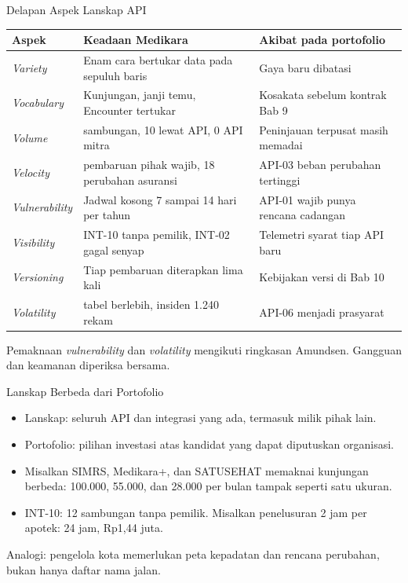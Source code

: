 \documentclass[aspectratio=169, table, 12pt]{beamer}
\begin{document}
\begin{frame}{{\Large Delapan Aspek Lanskap API}}
  \scriptsize
  \begin{tabularx}{\textwidth}{>{\raggedright\arraybackslash}p{1.9cm} >{\raggedright\arraybackslash}X >{\raggedright\arraybackslash}p{4.7cm}}
    \hline
    \textbf{Aspek} & \textbf{Keadaan Medikara} & \textbf{Akibat pada portofolio} \\ \hline
    \textit{Variety} & Enam cara bertukar data pada sepuluh baris & Gaya baru dibatasi \\ \hline
    \textit{Vocabulary} & Kunjungan, janji temu, Encounter tertukar & Kosakata sebelum kontrak Bab 9 \\ \hline
    \textit{Volume} & 100 sambungan, 10 lewat API, 0 API mitra & Peninjauan terpusat masih memadai \\ \hline
    \textit{Velocity} & 4 pembaruan pihak wajib, 18 perubahan asuransi & API-03 beban perubahan tertinggi \\ \hline
    \textit{Vulnerability} & Jadwal kosong 7 sampai 14 hari per tahun & API-01 wajib punya rencana cadangan \\ \hline
    \textit{Visibility} & INT-10 tanpa pemilik, INT-02 gagal senyap & Telemetri syarat tiap API baru \\ \hline
    \textit{Versioning} & Tiap pembaruan diterapkan lima kali & Kebijakan versi di Bab 10 \\ \hline
    \textit{Volatility} & 138 tabel berlebih, insiden 1.240 rekam & API-06 menjadi prasyarat \\ \hline
  \end{tabularx}

  \vspace{6pt}
  {\footnotesize Pemaknaan \textit{vulnerability} dan \textit{volatility} mengikuti ringkasan Amundsen. Gangguan dan keamanan diperiksa bersama.}
\end{frame}

\begin{frame}{{\Large Lanskap Berbeda dari Portofolio}}
  \vspace{8pt}
  \begin{itemize}
    \item Lanskap: seluruh API dan integrasi yang ada, termasuk milik pihak lain.
    \item Portofolio: pilihan investasi atas kandidat yang dapat diputuskan organisasi.
    \item Misalkan SIMRS, Medikara+, dan SATUSEHAT memaknai kunjungan berbeda: 100.000, 55.000, dan 28.000 per bulan tampak seperti satu ukuran.
    \item INT-10: 12 sambungan tanpa pemilik. Misalkan penelusuran 2 jam per apotek: 24 jam, Rp1,44 juta.
  \end{itemize}
  \vspace{6pt}
  {\small Analogi: pengelola kota memerlukan peta kepadatan dan rencana perubahan, bukan hanya daftar nama jalan.}
\end{frame}
\end{document}
